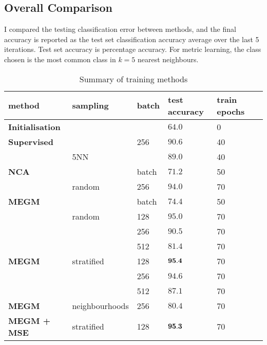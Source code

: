 \subsection{Overall Comparison}

I compared the testing classification error between methods, and the final accuracy is reported as the test set classification accuracy average over the last 5 iterations. Test set accuracy is percentage accuracy. For metric learning, the class chosen is the most common class in $k = 5$ nearest neighbours.


\begin{table*}[ht]

\centering
  \caption{Summary of training methods}

  \begin{tabular}{  l l  l  l l l }
  
    \toprule
    method &  sampling & batch  & test accuracy &  train epochs \\  \hline
    \bf{Initialisation} & &  &  $ 64.0  $ & 0  &  \\  
    \hline
    
    \bf{Supervised} & & 256 &  $ 90.6  $ & 40  &  \\  
     & 5NN  &  &  $ 89.0  $ & 40 &  \\  
     \hline
    
    \bf{NCA} &  & batch &  $  71.2  $ &  50  & \\
     & random & 256 & $  94.0  $ & 70 & \\
    
    \hline
    
    \bf{MEGM} &  & batch  &  $  74.4  $ &  50  & \\
     & random & 128 &  $  95.0  $ &  70  & \\     
     &  & 256 & $  90.5  $ &  70 & \\  
     &  & 512 & $  81.4  $ &  70 & \\
    
    \hline
    \bf{MEGM} & stratified & 128 & $  {\bf 95.4 }  $ & 70 & \\  
    
     &  & 256 & $  94.6  $ & 70 & \\  
     &  & 512 & $  87.1  $ & 70 & \\  

     \hline
     
    \bf{MEGM} & neighbourhoods & 256 & $  80.4  $ & 70  & \\
    
    \hline
    
    \bf{MEGM + MSE} & stratified & 128 & $  {\bf 95.3 }  $ & 70  & \\

      \bottomrule
    
    \end{tabular}
\label{fig:metric_summary}
\end{table*}



